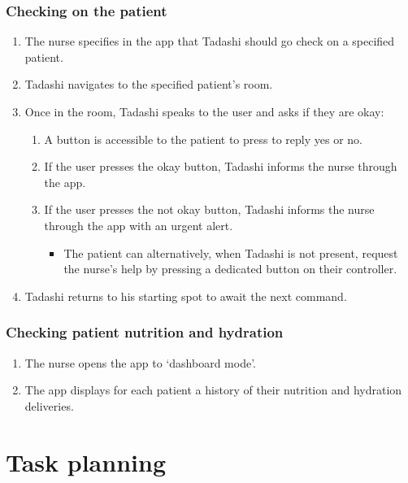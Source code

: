 \documentclass{article}
\begin{document}
\subsubsection{Checking on the patient}
\begin{enumerate}
\item The nurse specifies in the app that Tadashi should go check on a specified patient. 
\item Tadashi navigates to the specified patient's room.
\item Once in the room, Tadashi speaks to the user and asks if they are okay:
  \begin{enumerate}
  \item A button is accessible to the patient to press to reply yes or no.
  \item If the user presses the okay button, Tadashi informs the nurse through the app. 
  \item If the user presses the not okay button, Tadashi informs the nurse through the app with an urgent alert.
    \begin{itemize}
    \item The patient can alternatively, when Tadashi is not present, request the nurse's help by pressing a dedicated button on their controller. 
    \end{itemize}
  \end{enumerate}
\item Tadashi returns to his starting spot to await the next command. 
\end{enumerate}


\subsubsection{Checking patient nutrition and hydration}
\begin{enumerate}
\item The nurse opens the app to `dashboard mode'.
\item The app displays for each patient a history of their nutrition and hydration deliveries. 
\end{enumerate}
\section{Task planning}
\end{document}
